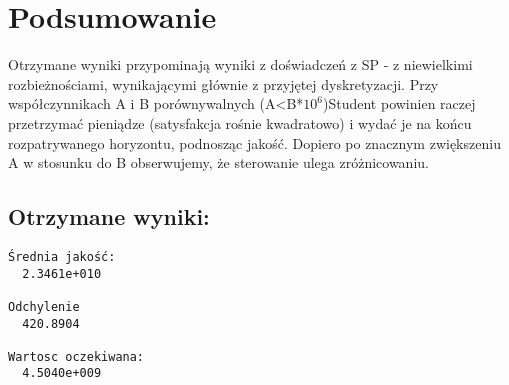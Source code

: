 \documentclass[11pt,a4paper]{article}
\begin{document}
\section{Podsumowanie}
Otrzymane wyniki przypominają wyniki z doświadczeń z SP - z niewielkimi rozbieżnościami, wynikającymi głównie z przyjętej dyskretyzacji.
Przy współczynnikach A i B porównywalnych (A<B*$10^6$)Student powinien raczej przetrzymać pieniądze (satysfakcja rośnie kwadratowo) i wydać je na końcu rozpatrywanego horyzontu, podnosząc jakość. Dopiero po znacznym zwiększeniu A w stosunku do B obserwujemy, że sterowanie ulega zróżnicowaniu.
\subsection{Otrzymane wyniki:}
\begin{verbatim}
Średnia jakość:
  2.3461e+010

Odchylenie
  420.8904

Wartosc oczekiwana:
  4.5040e+009
\end{verbatim}
\end{document}
